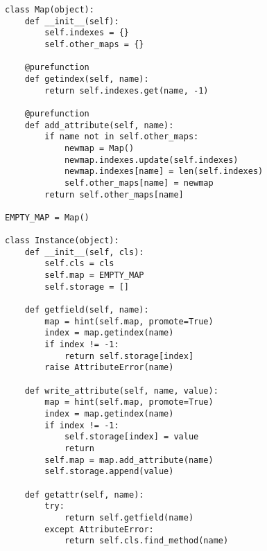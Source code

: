 \begin{lstlisting}[mathescape,basicstyle=\ttfamily]
class Map(object):
    def __init__(self):
        self.indexes = {}
        self.other_maps = {}

    @purefunction
    def getindex(self, name):
        return self.indexes.get(name, -1)

    @purefunction
    def add_attribute(self, name):
        if name not in self.other_maps:
            newmap = Map()
            newmap.indexes.update(self.indexes)
            newmap.indexes[name] = len(self.indexes)
            self.other_maps[name] = newmap
        return self.other_maps[name]

EMPTY_MAP = Map()

class Instance(object):
    def __init__(self, cls):
        self.cls = cls
        self.map = EMPTY_MAP
        self.storage = []

    def getfield(self, name):
        map = hint(self.map, promote=True)
        index = map.getindex(name)
        if index != -1:
            return self.storage[index]
        raise AttributeError(name)

    def write_attribute(self, name, value):
        map = hint(self.map, promote=True)
        index = map.getindex(name)
        if index != -1:
            self.storage[index] = value
            return
        self.map = map.add_attribute(name)
        self.storage.append(value)

    def getattr(self, name):
        try:
            return self.getfield(name)
        except AttributeError:
            return self.cls.find_method(name)
\end{lstlisting}
